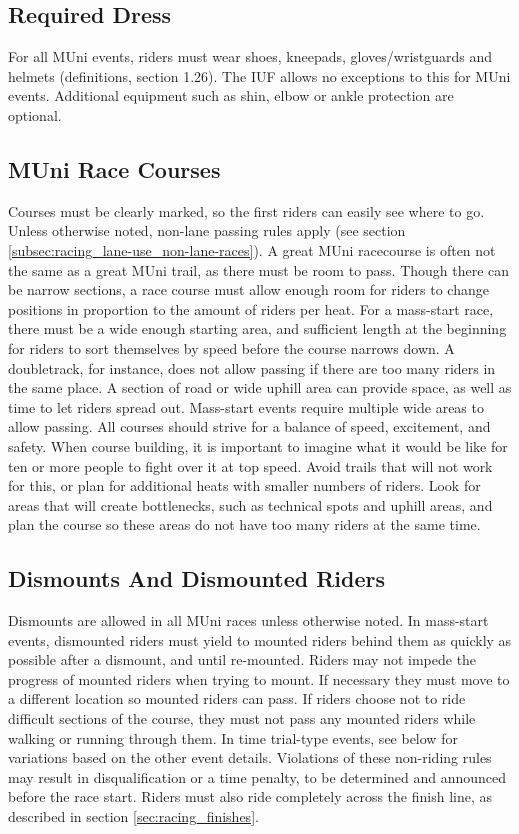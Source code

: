 \subsection{Required Dress}
For all MUni events, riders must wear shoes, kneepads, gloves/wristguards and helmets (definitions, section 1.26). %
The IUF allows no exceptions to this for MUni events.
Additional equipment such as shin, elbow or ankle protection are optional.

\subsection{MUni Race Courses}
Courses must be clearly marked, so the first riders can easily see where to go.
Unless otherwise noted, non-lane passing rules apply (see section \ref{subsec:racing_lane-use_non-lane-races}).
A great MUni racecourse is often not the same as a great MUni trail, as there must be room to pass.
Though there can be narrow sections, a race course must allow enough room for riders to change positions in proportion to the amount of riders per heat.
For a mass-start race, there must be a wide enough starting area, and sufficient length at the beginning for riders to sort themselves by speed before the course narrows down.
A doubletrack, for instance, does not allow passing if there are too many riders in the same place.
A section of road or wide uphill area can provide space, as well as time to let riders spread out.
Mass-start events require multiple wide areas to allow passing.
All courses should strive for a balance of speed, excitement, and safety.
When course building, it is important to imagine what it would be like for ten or more people to fight over it at top speed.
Avoid trails that will not work for this, or plan for additional heats with smaller numbers of riders.
Look for areas that will create bottlenecks, such as technical spots and uphill areas, and plan the course so these areas do not have too many riders at the same time.

\subsection{Dismounts And Dismounted Riders}
Dismounts are allowed in all MUni races unless otherwise noted.
In mass-start events, dismounted riders must yield to mounted riders behind them as quickly as possible after a dismount, and until re-mounted.
Riders may not impede the progress of mounted riders when trying to mount.
If necessary they must move to a different location so mounted riders can pass.
If riders choose not to ride difficult sections of the course, they must not pass any mounted riders while walking or running through them.
In time trial-type events, see below for variations based on the other event details.
Violations of these non-riding rules may result in disqualification or a time penalty, to be determined and announced before the race start.
Riders must also ride completely across the finish line, as described in section \ref{sec:racing_finishes}.

